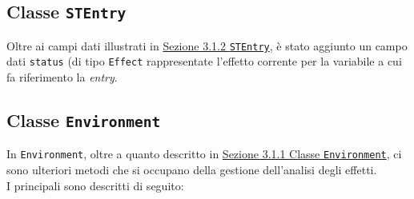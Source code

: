 \documentclass[../report.tex]{subfiles}
\begin{document}
\subsection[Classe STEntry]{Classe \texttt{STEntry}}\label{ss:stentry-effetti}
Oltre ai campi dati illustrati in \hyperref[ss:stentry]{Sezione 3.1.2 \texttt{STEntry}}, è stato aggiunto un campo dati \verb|status| (di tipo \verb|Effect| rappresentate l'effetto corrente per la variabile a cui fa riferimento la \textit{entry}.

\subsection[Classe Environment]{Classe \texttt{Environment}}\label{ss:environment-effetti}
In \verb|Environment|, oltre a quanto descritto in \hyperref[ss:environment]{Sezione 3.1.1 Classe \texttt{Environment}}, ci sono ulteriori metodi che si occupano della gestione dell'analisi degli effetti.\\
\noindent
I principali sono descritti di seguito:
\end{document}
